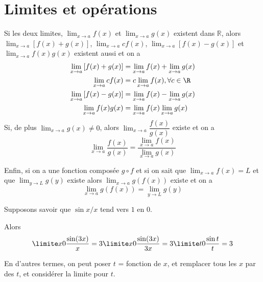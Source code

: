 \section{Limites et opérations}
\begin{frame}
  \begin{proposition}
    Si les deux limites, $\displaystyle{\lim_{x \to a} f(x)}$ et $\displaystyle{\lim_{x \to a} g(x)}$ existent dans $\mathbb R$, alors\pause{} $\displaystyle{\lim_{x \to a} \left[f(x)+g(x)\right]}$, $\displaystyle{\lim_{x \to a} cf(x)}$, $\displaystyle{\lim_{x \to a} \left[f(x)-g(x)\right]}$ et $\displaystyle{\lim_{x \to a} f(x)g(x)}$ existent aussi\pause{} et on a
    \begin{align*}
      \lim_{x \to a} \left[f(x)+g(x)\right] &= \lim_{x \to a} f(x) +
                                              \lim_{x \to a} g(x)\\
      \lim_{x \to a} cf(x) &= c \lim_{x \to a} f(x), \forall c \in \R\\
      \lim_{x \to a} \left[ f(x) - g(x) \right] &= \lim_{x \to a} f(x) -
                                                  \lim_{x \to a} g(x)\\
      \lim_{x \to a} f(x) g(x) &= \lim_{x \to a} f(x) \lim_{x \to a} g(x)
    \end{align*}\pause
    Si, de plus $\displaystyle{\lim_{x \to a} g(x) \neq 0}$,\pause{} alors $\displaystyle{\lim_{x \to a} \dfrac{f(x)}{g(x)}}$ existe\pause{} et on a
    \begin{equation*}
      \lim_{x \to a} \frac{f(x)}{g(x)} = \frac{\lim_{x \to a}
          f(x)}{\lim_{x \to a} g(x)}
    \end{equation*}
  \end{proposition}
\end{frame}
\begin{frame}
  \begin{proposition}
    Enfin, si on a une fonction composée $g \circ f$ et si on sait que $\displaystyle\lim_{x \to a} f(x) = L$ et que $\displaystyle\lim_{y \to L} g(y)$ existe alors $\displaystyle\lim_{x \to a} g(f(x))$ existe et on a
    \begin{equation*}
      \lim_{x \to a} g(f(x)) = \lim_{y \to L} g(y)
    \end{equation*}
  \end{proposition}
\end{frame}
\begin{frame}
  \begin{example}%
    Supposons savoir que \(\sin x/x\) tend vers \(1\) en \(0\).

    Alors
    \begin{equation*}
      \limite x 0 \frac{\sin (3x)}{x} = 3 \limite x 0 \frac{\sin (3x)}{3x} = 3 \limite t 0 \frac{\sin t}{t} = 3
    \end{equation*}
  \end{example}
  \begin{remark}
    En d'autres termes, on peut poser \(t\) = fonction de \(x\), et remplacer tous les \(x\) par des \(t\), et considérer la limite pour \(t\).
  \end{remark}
\end{frame}

